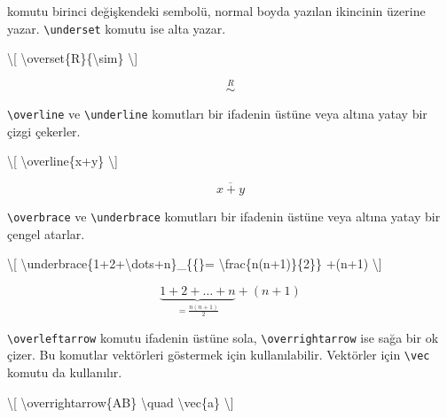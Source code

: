 \documentclass[
  10pt,
]{scrbook}
\newenvironment{Shaded}{\begin{snugshade}}{\end{snugshade}}
\newcommand{\SpecialCharTok}[1]{\textcolor[rgb]{0.00,0.00,0.00}{#1}}
\newcommand{\SpecialStringTok}[1]{\textcolor[rgb]{0.31,0.60,0.02}{#1}}
\theoremstyle{definition}
\theoremstyle{definition}
\theoremstyle{definition}
\theoremstyle{definition}
\theoremstyle{remark}
\begin{document}
komutu birinci değişkendeki sembolü, normal boyda yazılan ikincinin üzerine yazar. \texttt{\textbackslash{}underset} komutu ise alta yazar.

\begin{Shaded}
\begin{Highlighting}[]
\SpecialStringTok{\textbackslash{}[}
\SpecialCharTok{\textbackslash{}overset}\SpecialStringTok{\{R\}\{}\SpecialCharTok{\textbackslash{}sim}\SpecialStringTok{\}}
\SpecialStringTok{\textbackslash{}]}
\end{Highlighting}
\end{Shaded}

\[
\overset{R}{\sim}
\]

\texttt{\textbackslash{}overline} ve \texttt{\textbackslash{}underline} komutları bir ifadenin üstüne veya altına yatay bir çizgi çekerler.

\begin{Shaded}
\begin{Highlighting}[]
\SpecialStringTok{\textbackslash{}[}
\SpecialCharTok{\textbackslash{}overline}\SpecialStringTok{\{x+y\}}
\SpecialStringTok{\textbackslash{}]}
\end{Highlighting}
\end{Shaded}

\[
\overline{x+y}
\]

\texttt{\textbackslash{}overbrace} ve \texttt{\textbackslash{}underbrace} komutları bir ifadenin üstüne veya altına yatay bir çengel atarlar.

\begin{Shaded}
\begin{Highlighting}[]
\SpecialStringTok{\textbackslash{}[}
\SpecialCharTok{\textbackslash{}underbrace}\SpecialStringTok{\{1+2+}\SpecialCharTok{\textbackslash{}dots}\SpecialStringTok{+n\}\_\{\{\}=}
\SpecialCharTok{\textbackslash{}frac}\SpecialStringTok{\{n(n+1)\}\{2\}\}}
\SpecialStringTok{+(n+1)}
\SpecialStringTok{\textbackslash{}]}
\end{Highlighting}
\end{Shaded}

\[
\underbrace{1+2+\dots+n}_{{}=
\frac{n(n+1)}{2}}
+(n+1)
\]

\texttt{\textbackslash{}overleftarrow} komutu ifadenin üstüne sola, \texttt{\textbackslash{}overrightarrow} ise sağa bir ok çizer. Bu komutlar vektörleri göstermek için kullanılabilir. Vektörler için \texttt{\textbackslash{}vec} komutu da kullanılır.

\begin{Shaded}
\begin{Highlighting}[]
\SpecialStringTok{\textbackslash{}[}
\SpecialCharTok{\textbackslash{}overrightarrow}\SpecialStringTok{\{AB\} }\SpecialCharTok{\textbackslash{}quad}\SpecialStringTok{ }\SpecialCharTok{\textbackslash{}vec}\SpecialStringTok{\{a\}}
\SpecialStringTok{\textbackslash{}]}
\end{Highlighting}
\end{Shaded}
\end{document}
